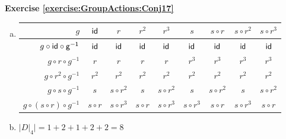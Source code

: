 \noindent\textbf{Exercise \ref{exercise:GroupActions:Conj17}}
\begin{enumerate}[(a)]
\item
%
%
%
\begin{tabular}{ |r| c | c |c |c |c |c | c|c |} \hline
  $g$ &$\sf{id}$ & $r$ &$r^2$ &$r^3$ & $s$ &$s\circ r$ & $s\circ r ^2$ & $s\circ r^3$\\ \hline
  $g\circ \sf{id}\circ g^{-1}$ & $\sf{id}$ & $\sf{id}$ & $\sf{id}$ & $\sf{id}$ & $\sf{id}$ & $\sf{id}$ & $\sf{id}$ & $\sf{id}$ \\ \hline
  $g\circ r \circ g^{-1}$ & $r$ & $r$ & $r$ & $r$ & $r^3$ & $r^3$ & $r^3$ & $r^3$ \\ \hline
  $g\circ r^2 \circ g^{-1}$ & $r^2$ & $r^2$ & $r^2$ & $r^2$ & $r^2$ & $r^2$ & $r^2$ & $r^2$\\ \hline
  $g\circ s \circ g^{-1}$ & $s$ & $s \circ r^2$ & $s$ & $s \circ r^2$ & $s$ & $s \circ r^2$ & $s$ & $s \circ r^2$ \\ \hline
  $g\circ (s \circ r) \circ g^{-1}$ & $s \circ r$ & $s \circ r^3$ & $s \circ r$ & $s \circ r^3$ & $s \circ r^3$ & $s \circ r$ & $s \circ r^3$ & $s \circ r$ \\ \hline
\end{tabular}

\item 
$|D|_4| = 1 + 2 + 1 + 2 + 2 = 8$
\end{enumerate}


